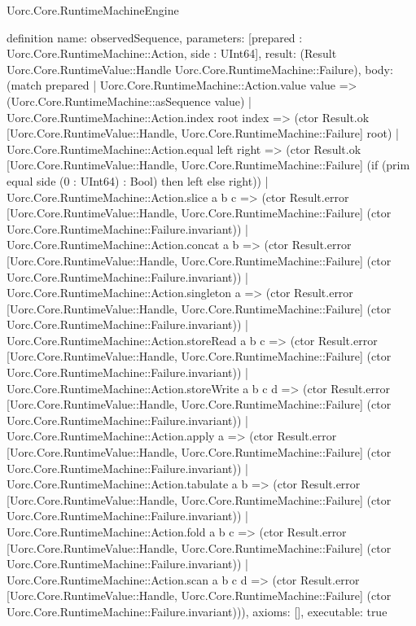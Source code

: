 \begin{lexlean}{Uorc.Core.RuntimeMachineEngine}
\begin{semanticmodule}
definition{
  name: observedSequence,
  parameters: [prepared : Uorc.Core.RuntimeMachine::Action, side : UInt64],
  result: (Result Uorc.Core.RuntimeValue::Handle Uorc.Core.RuntimeMachine::Failure),
  body: (match prepared
    | Uorc.Core.RuntimeMachine::Action.value value => (Uorc.Core.RuntimeMachine::asSequence value)
    | Uorc.Core.RuntimeMachine::Action.index root index => (ctor Result.ok [Uorc.Core.RuntimeValue::Handle, Uorc.Core.RuntimeMachine::Failure] root)
    | Uorc.Core.RuntimeMachine::Action.equal left right => (ctor Result.ok [Uorc.Core.RuntimeValue::Handle, Uorc.Core.RuntimeMachine::Failure] (if (prim equal side (0 : UInt64) : Bool) then left else right))
    | Uorc.Core.RuntimeMachine::Action.slice a b c => (ctor Result.error [Uorc.Core.RuntimeValue::Handle, Uorc.Core.RuntimeMachine::Failure] (ctor Uorc.Core.RuntimeMachine::Failure.invariant))
    | Uorc.Core.RuntimeMachine::Action.concat a b => (ctor Result.error [Uorc.Core.RuntimeValue::Handle, Uorc.Core.RuntimeMachine::Failure] (ctor Uorc.Core.RuntimeMachine::Failure.invariant))
    | Uorc.Core.RuntimeMachine::Action.singleton a => (ctor Result.error [Uorc.Core.RuntimeValue::Handle, Uorc.Core.RuntimeMachine::Failure] (ctor Uorc.Core.RuntimeMachine::Failure.invariant))
    | Uorc.Core.RuntimeMachine::Action.storeRead a b c => (ctor Result.error [Uorc.Core.RuntimeValue::Handle, Uorc.Core.RuntimeMachine::Failure] (ctor Uorc.Core.RuntimeMachine::Failure.invariant))
    | Uorc.Core.RuntimeMachine::Action.storeWrite a b c d => (ctor Result.error [Uorc.Core.RuntimeValue::Handle, Uorc.Core.RuntimeMachine::Failure] (ctor Uorc.Core.RuntimeMachine::Failure.invariant))
    | Uorc.Core.RuntimeMachine::Action.apply a => (ctor Result.error [Uorc.Core.RuntimeValue::Handle, Uorc.Core.RuntimeMachine::Failure] (ctor Uorc.Core.RuntimeMachine::Failure.invariant))
    | Uorc.Core.RuntimeMachine::Action.tabulate a b => (ctor Result.error [Uorc.Core.RuntimeValue::Handle, Uorc.Core.RuntimeMachine::Failure] (ctor Uorc.Core.RuntimeMachine::Failure.invariant))
    | Uorc.Core.RuntimeMachine::Action.fold a b c => (ctor Result.error [Uorc.Core.RuntimeValue::Handle, Uorc.Core.RuntimeMachine::Failure] (ctor Uorc.Core.RuntimeMachine::Failure.invariant))
    | Uorc.Core.RuntimeMachine::Action.scan a b c d => (ctor Result.error [Uorc.Core.RuntimeValue::Handle, Uorc.Core.RuntimeMachine::Failure] (ctor Uorc.Core.RuntimeMachine::Failure.invariant))),
  axioms: [],
  executable: true
}


\end{semanticmodule}
\end{lexlean}

